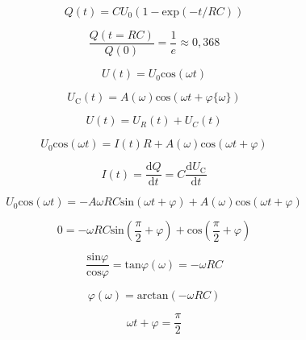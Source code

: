     \begin{equation}
        Q(t) = CU_0(1- \text{exp}(-t/RC))
    \end{equation}

    \begin{equation}
        \frac{Q(t = RC)}{Q(0)} = \frac{1}{e} \approx 0,368
    \end{equation}

    \begin{equation}
        U(t) = U_0 \text{cos}( \omega t)
    \end{equation}

    \begin{equation}
        U_{\text{C}}(t) = A(\omega) \text{cos}(\omega t + \varphi \{ \omega \} )
    \end{equation}

    \begin{equation}
        U(t) = U_R(t) + U_C(t)
    \end{equation}

    \begin{equation}
        U_0 \text{cos}(\omega t) = I(t)R + A(\omega) \text{cos}(\omega t + \varphi)
    \end{equation}

    \begin{equation}
        I(t) = \frac{\text{d}Q}{\text{d}t} = C \frac{\text{d}U_\text{C}}{\text{d}t}
    \end{equation}

    \begin{equation}
        U_0 \text{cos}(\omega t) = -A\omega R C \text{sin}(\omega t + \varphi) + A(\omega) \text{cos}(\omega t + \varphi)
    \end{equation}

    \begin{equation}
        0 = -\omega R C \text{sin} \left( \frac{\pi}{2} + \varphi \right) + \text{cos} \left( \frac{\pi}{2} + \varphi \right)
    \end{equation}

    \begin{equation}
        \frac{\text{sin} \varphi}{\text{cos} \varphi} = \text{tan} \varphi (\omega) = -\omega RC 
    \end{equation}

    \begin{equation}
        \varphi (\omega) = \text{arctan} ( - \omega R C)
    \end{equation}

    \begin{equation}
        \omega t + \varphi = \frac{\pi}{2}
    \end{equation}


